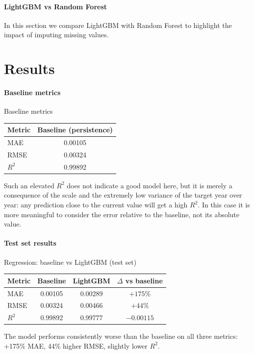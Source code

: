 \paragraph{LightGBM vs Random Forest} In this section we compare LightGBM with Random Forest to highlight the impact of imputing missing values.

\section{Results}

\paragraph{Baseline metrics}
\begin{center}
Baseline metrics
\vspace{4pt}

\begin{tabular}{lc}
\toprule
Metric & Baseline (persistence) \\
\midrule
MAE   & 0.00105 \\
RMSE  & 0.00324 \\
$R^2$ & 0.99892 \\
\bottomrule
\end{tabular}
\label{tab:baseline-metrics}
\end{center}

Such an elevated $R^2$ does not indicate a good model here, but it is merely a consequence of the scale and the extremely low variance of the target year over year: any prediction close to the current value will get a high $R^2$. In this case it is more meaningful to consider the error relative to the baseline, not its absolute value.

\paragraph{Test set results}
\begin{center}
Regression: baseline vs LightGBM (test set)
\vspace{4pt}

\begin{tabular}{lccc}
\toprule
Metric & Baseline & LightGBM & $\Delta$ vs baseline \\
\midrule
MAE  & 0.00105 & 0.00289 & $+175\%$ \\
RMSE & 0.00324 & 0.00466 & $+44\%$ \\
$R^2$ & 0.99892 & 0.99777 & $-0.00115$ \\
\bottomrule
\end{tabular}
\end{center}
The model performs consistently worse than the baseline on all three metrics: +175\% MAE, 44\% higher RMSE, slightly lower $R^2$. 

